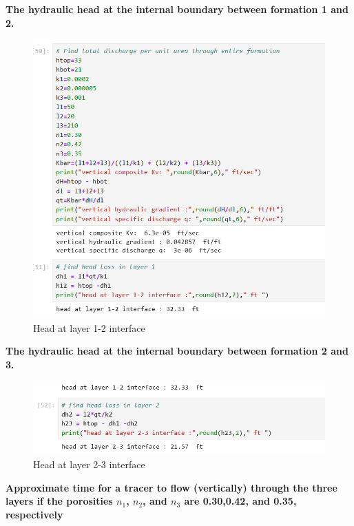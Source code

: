 \documentclass[12pt]{article}
\begin{document}
\begin{enumerate}
\clearpage

\textbf{The hydraulic head at the internal boundary between formation 1 and 2.}

\begin{figure}[h!] %
   \centering
   \includegraphics[width=5in]{headlayer1.png} 
   \caption{Head at layer 1-2 interface}
   \label{fig:layredsystem}
\end{figure}

\clearpage

\textbf{The hydraulic head at the internal boundary between formation 2 and 3.}

\begin{figure}[h!] %
   \centering
   \includegraphics[width=5in]{headlayer2.png} 
   \caption{Head at layer 2-3 interface}
   \label{fig:headlayer2}
\end{figure}

\clearpage

\textbf{Approximate time for a tracer to flow (vertically) through the three layers if the porosities $n_1$, $n_2$, and $n_3$ are 0.30,0.42, and 0.35, respectively}


\end{enumerate}
\end{document}
